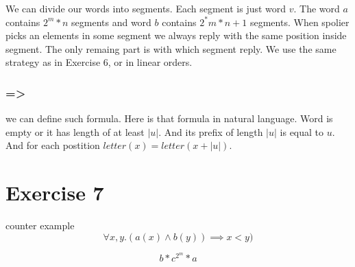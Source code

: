 \documentclass{article}
\begin{document}
We can divide our words into segments. Each segment is just word $v$. The word $a$ contains $2^m *n $ segments and word $b$ contains $2^*m * n + 1$ segments. When spolier picks an elements in some segment we always reply with the same position inside segment. The only remaing part is with which segment reply. We use the same strategy as in Exercise 6, or in linear orders.

\subsubsection{=>} we can define such formula. Here is that formula in natural language. Word is empty or it has length of at least $|u|$. And its prefix of length $|u|$ is equal to $u$. And for each postition $letter(x) = letter(x + |u|)$. 
\section{Exercise 7}
counter example
\[\forall x, y. (a(x) \land b(y)) \implies x < y)\]


\[b * c^{2^m} * a\]
\end{document}
